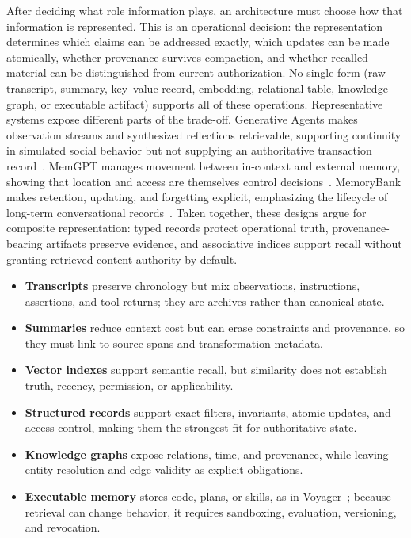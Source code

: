 After deciding what role information plays, an architecture must choose how that information is represented. This is an operational decision: the representation determines which claims can be addressed exactly, which updates can be made atomically, whether provenance survives compaction, and whether recalled material can be distinguished from current authorization. No single form (raw transcript, summary, key--value record, embedding, relational table, knowledge graph, or executable artifact) supports all of these operations. Representative systems expose different parts of the trade-off. Generative Agents makes observation streams and synthesized reflections retrievable, supporting continuity in simulated social behavior but not supplying an authoritative transaction record~\cite{park2023generativeagents}. MemGPT manages movement between in-context and external memory, showing that location and access are themselves control decisions~\cite{packer2024memgpt}. MemoryBank makes retention, updating, and forgetting explicit, emphasizing the lifecycle of long-term conversational records~\cite{zhong2024memorybank}. Taken together, these designs argue for composite representation: typed records protect operational truth, provenance-bearing artifacts preserve evidence, and associative indices support recall without granting retrieved content authority by default.

\begin{itemize}
    \item \textbf{Transcripts} preserve chronology but mix observations, instructions, assertions, and tool returns; they are archives rather than canonical state.
    \item \textbf{Summaries} reduce context cost but can erase constraints and provenance, so they must link to source spans and transformation metadata.
    \item \textbf{Vector indexes} support semantic recall, but similarity does not establish truth, recency, permission, or applicability.
    \item \textbf{Structured records} support exact filters, invariants, atomic updates, and access control, making them the strongest fit for authoritative state.
    \item \textbf{Knowledge graphs} expose relations, time, and provenance, while leaving entity resolution and edge validity as explicit obligations.
    \item \textbf{Executable memory} stores code, plans, or skills, as in Voyager~\cite{wang2023voyager}; because retrieval can change behavior, it requires sandboxing, evaluation, versioning, and revocation.
\end{itemize}

